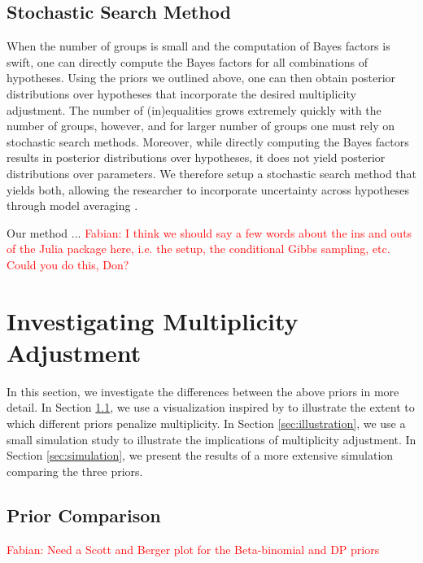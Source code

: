 \documentclass[11pt,a4paper]{article}
\theoremstyle{definition} %
\theoremstyle{case}
\newcommand{\FD}[1]{\textcolor{red}{Fabian: #1 }}
\begin{document}
\subsection{Stochastic Search Method}
When the number of groups is small and the computation of Bayes factors is swift, one can directly compute the Bayes factors for all combinations of hypotheses. Using the priors we outlined above, one can then obtain posterior distributions over hypotheses that incorporate the desired multiplicity adjustment. The number of (in)equalities grows extremely quickly with the number of groups, however, and for larger number of groups one must rely on stochastic search methods. Moreover, while directly computing the Bayes factors results in posterior distributions over hypotheses, it does not yield posterior distributions over parameters. We therefore setup a stochastic search method that yields both, allowing the researcher to incorporate uncertainty across hypotheses through model averaging \parencite[e.g.,][]{hinne2020conceptual, hoeting1999bayesian}.

Our method ...
\FD{I think we should say a few words about the ins and outs of the Julia package here, i.e. the setup, the conditional Gibbs sampling, etc. Could you do this, Don?}

\section{Investigating Multiplicity Adjustment} \label{sec:simulation-study}
In this section, we investigate the differences between the above priors in more detail. In Section \ref{sec:scott-berger}, we use a visualization inspired by \textcite{scott2006exploration} to illustrate the extent to which different priors penalize multiplicity. In Section \ref{sec:illustration}, we use a small simulation study to illustrate the implications of multiplicity adjustment. In Section \ref{sec:simulation}, we present the results of a more extensive simulation comparing the three priors.

\subsection{Prior Comparison} \label{sec:scott-berger}
\FD{Need a Scott and Berger plot for the Beta-binomial and DP priors}
\end{document}
